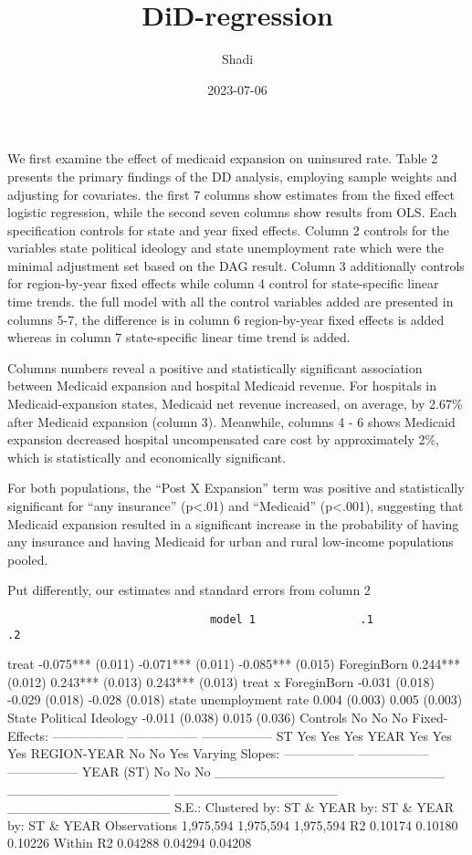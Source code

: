 \documentclass[
]{article}
\title{DiD-regression}
\author{Shadi}
\date{2023-07-06}
\begin{document}
\maketitle

We first examine the effect of medicaid expansion on uninsured rate.
Table 2 presents the primary findings of the DD analysis, employing
sample weights and adjusting for covariates. the first 7 columns show
estimates from the fixed effect logistic regression, while the second
seven columns show results from OLS. Each specification controls for
state and year fixed effects. Column 2 controls for the variables state
political ideology and state unemployment rate which were the minimal
adjustment set based on the DAG result. Column 3 additionally controls
for region-by-year fixed effects while column 4 control for
state-specific linear time trends. the full model with all the control
variables added are presented in columns 5-7, the difference is in
column 6 region-by-year fixed effects is added whereas in column 7
state-specific linear time trend is added.

Columns numbers reveal a positive and statistically significant
association between Medicaid expansion and hospital Medicaid revenue.
For hospitals in Medicaid-expansion states, Medicaid net revenue
increased, on average, by 2.67\% after Medicaid expansion (column 3).
Meanwhile, columns 4 - 6 shows Medicaid expansion decreased hospital
uncompensated care cost by approximately 2\%, which is statistically and
economically significant.

For both populations, the ``Post X Expansion'' term was positive and
statistically significant for ``any insurance'' (p\textless.01) and
``Medicaid'' (p\textless.001), suggesting that Medicaid expansion
resulted in a significant increase in the probability of having any
insurance and having Medicaid for urban and rural low-income populations
pooled.

Put differently, our estimates and standard errors from column 2

\begin{verbatim}
                               model 1                .1                .2
\end{verbatim}

treat -0.075*** (0.011) -0.071*** (0.011) -0.085*** (0.015) ForeginBorn
0.244*** (0.012) 0.243*** (0.013) 0.243*** (0.013) treat x ForeginBorn
-0.031 (0.018) -0.029 (0.018) -0.028 (0.018) state unemployment rate
0.004 (0.003) 0.005 (0.003) State Political Ideology -0.011 (0.038)
0.015 (0.036) Controls No No No Fixed-Effects: -----------------
----------------- ----------------- ST Yes Yes Yes YEAR Yes Yes Yes
REGION-YEAR No No Yes Varying Slopes: -----------------
----------------- ----------------- YEAR (ST) No No No
\_\_\_\_\_\_\_\_\_\_\_\_\_\_\_\_\_\_\_\_\_\_\_\_
\_\_\_\_\_\_\_\_\_\_\_\_\_\_\_\_\_ \_\_\_\_\_\_\_\_\_\_\_\_\_\_\_\_\_
\_\_\_\_\_\_\_\_\_\_\_\_\_\_\_\_\_ S.E.: Clustered by: ST \& YEAR by: ST
\& YEAR by: ST \& YEAR Observations 1,975,594 1,975,594 1,975,594 R2
0.10174 0.10180 0.10226 Within R2 0.04288 0.04294 0.04208
\end{document}
